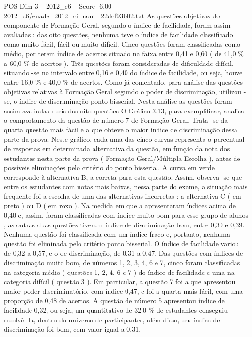 \begin{textsample}{POS Dim 3 – 2012\_c6 – Score -6.00 – 2012\_c6/enade\_2012\_ci\_cont\_22dcf93b02.txt}
As questões objetivas do componente de Formação Geral, segundo o índice de facilidade, foram assim avaliadas : das oito questões, nenhuma teve o índice de facilidade classificado como muito fácil, fácil ou muito difícil.
Cinco questões foram classificadas como médio, por terem índice de acertos situado na faixa entre 0,41 e 0,60 ( de 41,0 \% a 60,0 \% de acertos ).
Três questões foram consideradas de dificuldade difícil, situando -se no intervalo entre 0,16 e 0,40 do índice de facilidade, ou seja, houve entre 16,0 \% e 40,0 \% de acertos.
Como já comentado, para análise das questões objetivas relativas à Formação Geral segundo o poder de discriminação, utilizou -se, o índice de discriminação ponto bisserial.
Nesta análise as questões foram assim avaliadas : seis das oito questões O Gráfico 3.13, para exemplificar, analisa o comportamento da questão de número 7 de Formação Geral.
Trata -se da quarta questão mais fácil e a que obteve o maior índice de discriminação dessa parte da prova.
Neste gráfico, cada uma das cinco curvas representa o percentual de respostas em determinada alternativa da questão, em função da nota dos estudantes nesta parte da prova ( Formação Geral/Múltipla Escolha ), antes de possíveis eliminações pelo critério do ponto bisserial.
A curva em verde corresponde à alternativa B, a correta para esta questão.
Assim, observa -se que entre os estudantes com notas mais baixas, nessa parte do exame, a situação mais frequente foi a escolha de uma das alternativas incorretas : a alternativa C ( em preto ) ou D ( em roxo ).
Na medida em que a apresentaram índices acima de 0,40 e, assim, foram classificadas com índice muito bom para esse grupo de alunos ; as outras duas questões tiveram índice de discriminação bom, entre 0,30 e 0,39.
Nenhuma questão foi classificada com um índice fraco e, portanto, nenhuma questão foi eliminada pelo critério ponto bisserial.
O índice de facilidade variou de 0,32 a 0,57, e o de discriminação, de 0,31 a 0,47.
Das questões com índices de discriminação muito bom, de números 1, 2, 3, 4, 6 e 7, cinco foram classificadas na categoria médio ( questões 1, 2, 4, 6 e 7 ) do índice de facilidade e uma na categoria difícil ( questão 3 ).
Em particular, a questão 7 foi a que apresentou maior poder discriminatório, com índice 0,47, e foi a quarta mais fácil, com uma proporção de 0,48 de acertos.
A questão de número 5 apresentou índice de facilidade 0,32, ou seja, um quantitativo de 32,0 \% de estudantes conseguiu resolvê -la, dentro do universo de participantes, além disso, seu índice de discriminação foi bom, com valor igual a 0,31.

\end{textsample}
